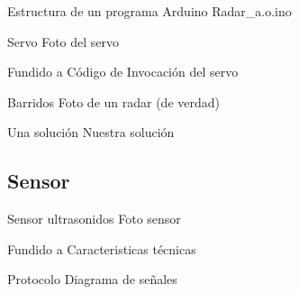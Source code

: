 \documentclass{beamer}
\begin{document}
\begin{frame}{Estructura de un programa Arduino}
  Radar\_a.o.ino
\end{frame}

\begin{frame}{Servo}
  Foto del servo

  Fundido a Código de Invocación del servo
  
\end{frame}

\begin{frame}{Barridos}
  Foto de un radar (de verdad)
\end{frame}

\begin{frame}{Una solución}
  Nuestra solución
\end{frame}

\subsection{Sensor}

\begin{frame}{Sensor ultrasonidos}
  Foto sensor

  Fundido a Caracteristicas técnicas
\end{frame}

\begin{frame}{Protocolo}
  Diagrama de señales
\end{frame}
\end{document}
